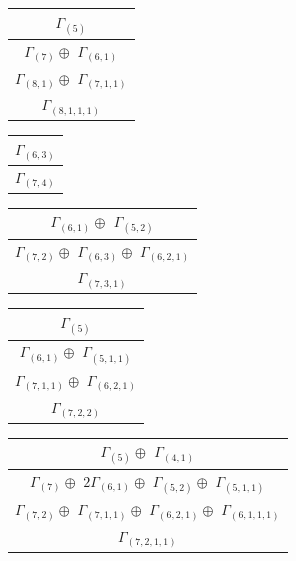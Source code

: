 \documentclass[main.tex]{subfiles}
\begin{document}
\begin{minipage}{.2\textwidth}
\centering
\begin{tabular}{c}
$\Gamma_{(
5
)}$
\\ \hline
$\Gamma_{(
7
)} \oplus$
$\Gamma_{(
6 , 
1
)}$
\\ \hline
$\Gamma_{(
8 , 
1
)} \oplus$
$\Gamma_{(
7 , 
1 , 
1
)}$
\\ \hline
$\Gamma_{(
8 , 
1 , 
1 , 
1
)}$
\\
\end{tabular}\end{minipage}
\begin{minipage}{.2\textwidth}
\centering
\begin{tabular}{c}
$\Gamma_{(
6 , 
3
)}$
\\ \hline
$\Gamma_{(
7 , 
4
)}$
\\
\end{tabular}\end{minipage}
\begin{minipage}{.3\textwidth}
\centering
\begin{tabular}{c}
$\Gamma_{(
6 , 
1
)} \oplus$
$\Gamma_{(
5 , 
2
)}$
\\ \hline
$\Gamma_{(
7 , 
2
)} \oplus$
$\Gamma_{(
6 , 
3
)} \oplus$
$\Gamma_{(
6 , 
2 , 
1
)}$
\\ \hline
$\Gamma_{(
7 , 
3 , 
1
)}$
\\
\end{tabular}\end{minipage}
\bigskip
\begin{minipage}{.2\textwidth}
\centering
\begin{tabular}{c}
$\Gamma_{(
5
)}$
\\ \hline
$\Gamma_{(
6 , 
1
)} \oplus$
$\Gamma_{(
5 , 
1 , 
1
)}$
\\ \hline
$\Gamma_{(
7 , 
1 , 
1
)} \oplus$
$\Gamma_{(
6 , 
2 , 
1
)}$
\\ \hline
$\Gamma_{(
7 , 
2 , 
2
)}$
\\
\end{tabular}\end{minipage}
\begin{minipage}{.4\textwidth}
\centering
\begin{tabular}{c}
$\Gamma_{(
5
)} \oplus$
$\Gamma_{(
4 , 
1
)}$
\\ \hline
$\Gamma_{(
7
)} \oplus$
$2\Gamma_{(
6 , 
1
)}  \oplus$
$\Gamma_{(
5 , 
2
)} \oplus$
$\Gamma_{(
5 , 
1 , 
1
)}$
\\ \hline
$\Gamma_{(
7 , 
2
)} \oplus$
$\Gamma_{(
7 , 
1 , 
1
)} \oplus$
$\Gamma_{(
6 , 
2 , 
1
)} \oplus$
$\Gamma_{(
6 , 
1 , 
1 , 
1
)}$
\\ \hline
$\Gamma_{(
7 , 
2 , 
1 , 
1
)}$
\\
\end{tabular}\end{minipage}
\end{document}
